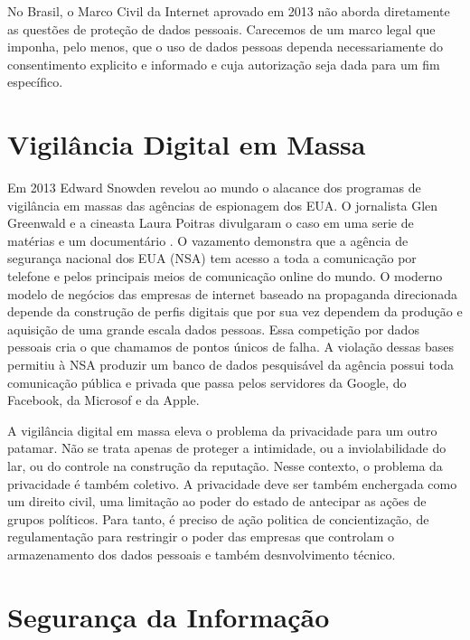 No Brasil, o Marco Civil da Internet aprovado em 2013 não aborda diretamente as questões de proteção de dados pessoais.
Carecemos de um marco legal que imponha, pelo menos, que o uso de dados pessoas dependa necessariamente do consentimento explicito e informado e cuja autorização seja dada para um fim específico.

\section{Vigilância Digital em Massa}
\label{sec:vigil-digital}

Em 2013 Edward Snowden revelou ao mundo o alacance dos programas de vigilância em massas das agências de espionagem dos EUA.
O jornalista Glen Greenwald e a cineasta Laura Poitras divulgaram o caso em uma serie de matérias e um documentário \cite{Greenwald14, Poitras14}.
O vazamento demonstra que a agência de segurança nacional dos EUA (NSA) tem acesso a toda a comunicação por telefone e pelos principais meios de comunicação online do mundo.
O moderno modelo de negócios das empresas de internet baseado na propaganda direcionada depende da construção de perfis digitais que por sua vez dependem da produção e aquisição de uma grande escala dados pessoas.
Essa competição por dados pessoais cria o que chamamos de pontos únicos de falha.
A violação dessas bases permitiu à NSA produzir um banco de dados pesquisável da agência possui toda comunicação pública e privada que passa pelos servidores da Google, do Facebook, da Microsof e da Apple.

A vigilância digital em massa eleva o problema da privacidade para um outro patamar.
Não se trata apenas de proteger a intimidade, ou a inviolabilidade do lar, ou do controle na construção da reputação. 
Nesse contexto, o problema da privacidade é também coletivo.
A privacidade deve ser também enchergada como um direito civil, uma limitação ao poder do estado de antecipar as ações de grupos políticos. 
Para tanto, é preciso de ação politica de concientização, de regulamentação para restringir o poder das empresas que controlam o armazenamento dos dados pessoais e também desnvolvimento técnico. 

\section{Segurança da Informação}
\label{sec:seg-inf}

